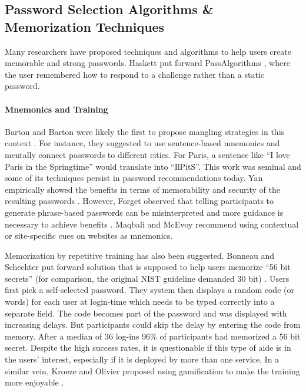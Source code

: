 	\subsection{Password Selection Algorithms \& Memorization Techniques}
	Many researchers have proposed techniques and algorithms to help users create memorable and strong passwords. Haskett put forward PassAlgorithms \cite{Haskett1984PassAlgorithms}, where the user remembered how to respond to a challenge rather than a static password. 
	\paragraph{Mnemonics and Training}
	Barton and Barton were likely the first to propose mangling strategies in this context \cite{Barton1984Mangling}. For instance, they suggested to use sentence-based mnemonics and mentally connect passwords to different cities. For Paris, a sentence like ``I love Paris in the Springtime'' would translate into ``IlPitS''. This work was seminal and some of its techniques persist in password recommendations today. Yan \etal empirically showed the benefits in terms of memorability and security of the resulting passwords \cite{Yan2004PasswordMemorabilitySecurity}. However, Forget \etal observed that telling participants to generate phrase-based passwords can be misinterpreted and more guidance is necessary to achieve benefits \cite{Forget2007HelpingUsers}. Maqbali \cite{Maqbali2016PasswordGenerators} and McEvoy \cite{Mcevoy2016ContextualizingMnemonicPhrase} recommend using contextual or site-specific cues on websites as mnemonics. 
	
	Memorization by repetitive training has also been suggested. Bonneau and Schechter put forward solution that is supposed to help users memorize ``56 bit secrets'' (for comparison, the original NIST guideline demanded 30 bit) \cite{Bonneau2014ReliableStorage56Bits}. Users first pick a self-selected password. They system then displays a random code (or words) for each user at login-time which needs to be typed correctly into a separate field. The code becomes part of the password and was displayed with increasing delays. But participants could skip the delay by entering the code from memory. After a median of 36 log-ins 96\% of participants had memorized a 56 bit secret. Despite the high success rates, it is questionable if this type of aide is in the users' interest, especially if it is deployed by more than one service. In a similar vein, Kroeze and Olivier proposed using gamification to make the training more enjoyable \cite{Kroeze2012GamifyingAuthentication}.
	
